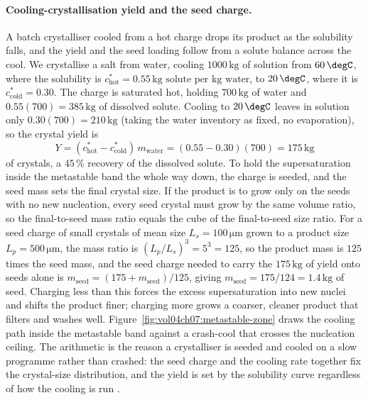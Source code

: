 \paragraph{Cooling-crystallisation yield and the seed charge.} A batch
crystalliser cooled from a hot charge drops its product as the solubility
falls, and the yield and the seed loading follow from a solute balance across
the cool. We crystallise a salt from water, cooling $1000\,\text{kg}$ of
solution from $60\,\degC$, where the solubility is $c^{*}_{\text{hot}} =
0.55\,\text{kg solute per kg water}$, to $20\,\degC$, where it is
$c^{*}_{\text{cold}} = 0.30$. The charge is saturated hot, holding
$700\,\text{kg}$ of water and $0.55(700) = 385\,\text{kg}$ of dissolved
solute. Cooling to $20\,\degC$ leaves in solution only $0.30(700) =
210\,\text{kg}$ (taking the water inventory as fixed, no evaporation), so the
crystal yield is
\[
Y = (c^{*}_{\text{hot}} - c^{*}_{\text{cold}})\,m_{\text{water}} =
(0.55 - 0.30)(700) = 175\,\text{kg}
\]
of crystals, a $45\,\%$ recovery of the dissolved solute. To hold the
supersaturation inside the metastable band the whole way down, the charge is
seeded, and the seed mass sets the final crystal size. If the product is to
grow only on the seeds with no new nucleation, every seed crystal must grow by
the same volume ratio, so the final-to-seed mass ratio equals the cube of the
final-to-seed size ratio. For a seed charge of small crystals of mean size
$L_s = 100\,\si{\micro\meter}$ grown to a product size $L_p = 500\,\si{
\micro\meter}$, the mass ratio is $(L_p/L_s)^3 = 5^3 = 125$, so the product
mass is $125$ times the seed mass, and the seed charge needed to carry the
$175\,\text{kg}$ of yield onto seeds alone is $m_{\text{seed}} =
(175 + m_{\text{seed}})/125$, giving $m_{\text{seed}} = 175/124 =
1.4\,\text{kg}$ of seed. Charging less than this forces the excess
supersaturation into new nuclei and shifts the product finer; charging more
grows a coarser, cleaner product that filters and washes well.
Figure~\ref{fig:vol04ch07:metastable-zone} draws the cooling path inside the
metastable band against a crash-cool that crosses the nucleation ceiling. The
arithmetic is the reason a crystalliser is seeded and cooled on a slow
programme rather than crashed: the seed charge and the cooling rate together
fix the crystal-size distribution, and the yield is set by the solubility
curve regardless of how the cooling is run \cite{text:perry-chemical-engineers}.



